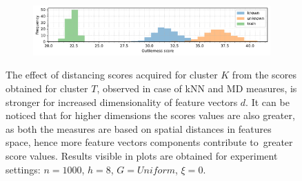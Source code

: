 \begin{figure}[t]
\begin{subfigure}[b]{\textwidth}
        \includegraphics[width=\textwidth]{images/distributions/hists-dimensions/hist-distributions-dimension_500-samples_1000-distance_8-distribution_uniform-model_MD-seed_0.pdf}
        \label{fig:hists-md-d500}
    \end{subfigure}
    \caption{The effect of distancing scores acquired for cluster $K$ from the scores obtained for cluster $T$, observed in case of kNN and MD measures, is stronger for increased dimensionality of feature vectors $d$. It can be noticed that for higher dimensions the scores values are also greater, as both the measures are based on spatial distances in features space, hence more feature vectors components contribute to~greater score values. Results visible in plots are obtained for experiment settings: $n = 1000$, $h = 8$, $G = \textit{Uniform}$, $\xi = 0$.}
    \label{fig:hists-dimensions}
\end{figure}


